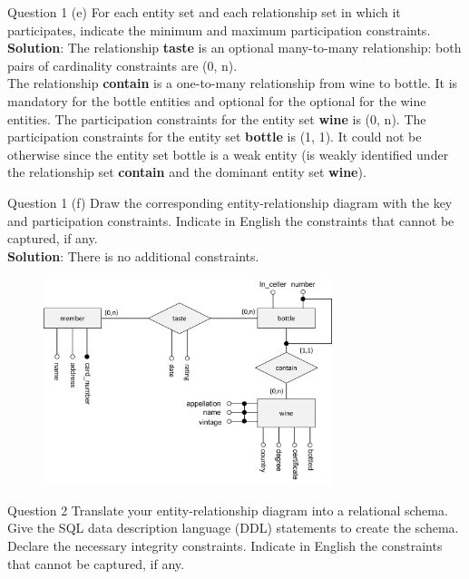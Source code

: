 \begin{frame}[fragile]{Question 1 (e)}
For each entity set and each relationship set in which it participates, indicate the minimum and maximum participation constraints.\\ \vspace{10pt}
\textbf{Solution}: The relationship \textbf{taste} is an optional many-to-many relationship: both pairs of cardinality constraints are (0, n).\\ \vspace{5pt}
The relationship \textbf{contain} is a one-to-many relationship from wine to bottle. It is mandatory for the bottle entities and optional for the optional for the wine entities. The participation constraints for the entity set \textbf{wine} is (0, n). The participation constraints for the entity set \textbf{bottle} is (1, 1). It could not be otherwise since the entity set bottle is a weak entity (is weakly identified under the relationship set \textbf{contain} and the dominant entity set \textbf{wine}).
\end{frame}


\begin{frame}[fragile]{Question 1 (f)}
Draw the corresponding entity-relationship diagram with the key and participation constraints. Indicate in English the constraints that cannot be captured, if any.\\ \vspace{5pt}
\textbf{Solution}: There is no additional constraints.

\begin{figure}
	\includegraphics[width=0.75\textwidth, trim=0 0 0 0, clip]{t4/images/er_diagram.png}
\end{figure}
\end{frame}


\begin{frame}[fragile]{Question 2}
Translate your entity-relationship diagram into a relational schema. Give the SQL data description language (DDL) statements to create the schema. Declare the necessary integrity constraints. Indicate in English the constraints that cannot be captured, if any.
\end{frame}

